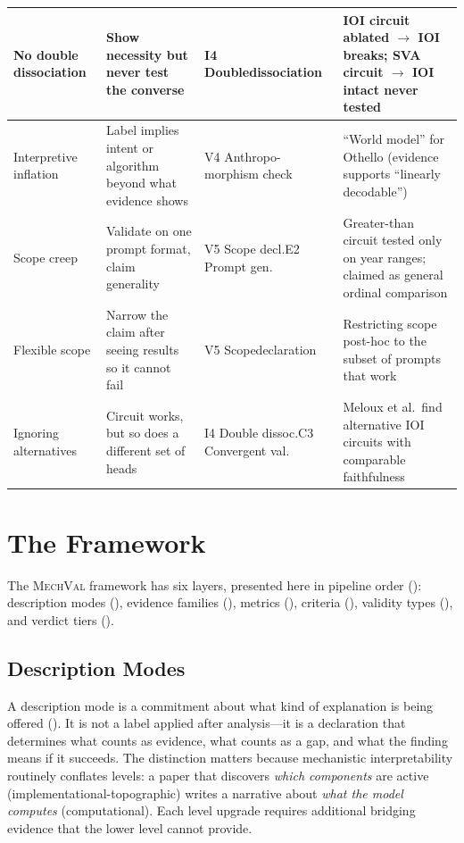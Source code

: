 \documentclass[10pt]{article}
\newcommand{\mechval}{\textsc{MechVal}}
\begin{document}
\begin{table}[H]
\begin{tabular}{@{}l>{\raggedright\arraybackslash}p{3.2cm}>{\raggedright\arraybackslash}p{2.8cm}>{\raggedright\arraybackslash}p{4.0cm}@{}}
\midrule
No double dissociation & Show necessity but never test the converse & I4 Double\newline dissociation & IOI circuit ablated $\to$ IOI breaks; SVA circuit $\to$ IOI intact never tested \\
\midrule
Interpretive inflation & Label implies intent or algorithm beyond what evidence shows & V4 Anthropo-\newline morphism check & ``World model'' for Othello (evidence supports ``linearly decodable'') \\
\midrule
Scope creep & Validate on one prompt format, claim generality & V5 Scope decl.\newline E2 Prompt gen. & Greater-than circuit tested only on year ranges; claimed as general ordinal comparison \\
\midrule
Flexible scope & Narrow the claim after seeing results so it cannot fail & V5 Scope\newline declaration & Restricting scope post-hoc to the subset of prompts that work \\
\midrule
Ignoring alternatives & Circuit works, but so does a different set of heads & I4 Double dissoc.\newline C3 Convergent val. & Meloux et al.\ find alternative IOI circuits with comparable faithfulness \\
\bottomrule
\end{tabular}
\end{table}
\endgroup


\section{The Framework}
\label{sec:framework}


The \mechval{} framework has six layers, presented here in pipeline order (): description modes (), evidence families (), metrics (), criteria (), validity types (), and verdict tiers ().

\subsection{Description Modes}
\label{sec:description-modes}

A description mode is a commitment about what kind of explanation is being offered (). It is not a label applied after analysis---it is a declaration that determines what counts as evidence, what counts as a gap, and what the finding means if it succeeds. The distinction matters because mechanistic interpretability routinely conflates levels: a paper that discovers \emph{which components} are active (implementational-topographic) writes a narrative about \emph{what the model computes} (computational). Each level upgrade requires additional bridging evidence that the lower level cannot provide.
\end{document}
